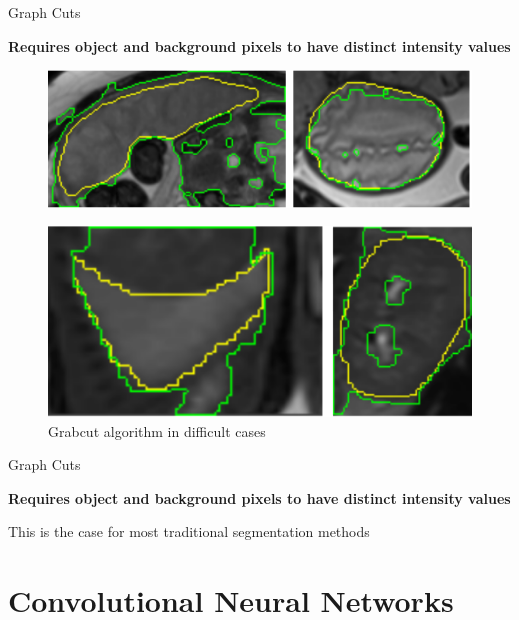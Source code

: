 \documentclass[10pt]{beamer}
\begin{document}
\begin{frame}[fragile]{Graph Cuts}

  \textbf{Requires object and background pixels to have distinct intensity values}
   
  \begin{figure}[h!]
    \centering
    \includegraphics[scale=0.25]{pictures/grabcuts1}
  \end{figure}

     
  \begin{figure}[h!]
    \centering
    \includegraphics[scale=0.25]{pictures/grabcuts2}
    \caption{Grabcut algorithm in difficult cases}
    \label{fig:minCut}
  \end{figure}
  
\end{frame}


\begin{frame}[fragile]{Graph Cuts}

  \textbf{Requires object and background pixels to have distinct intensity values}
   
  This is the case for most traditional segmentation methods
  
\end{frame}


\section{Convolutional Neural Networks}
\end{document}
